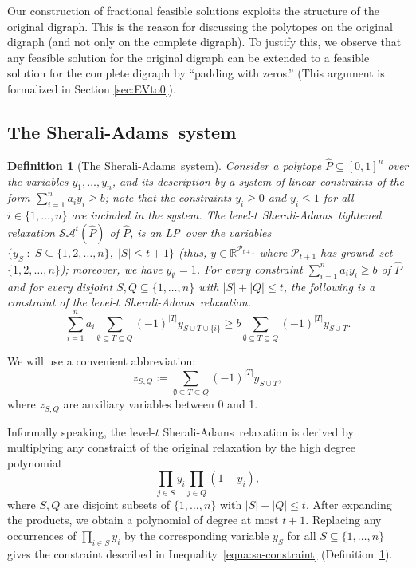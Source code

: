 \documentclass[11pt]{article}
\newtheorem{definition}[theorem]{Definition}
\newcommand{\sa}{\textsf{Sherali-Adams}}
\newcommand{\pop}{\mathcal{P}}
\newcommand \reals {\mathbb{R}}
\newcommand{\iLP}{\textsf{LP}}
\newcommand{\saop}{\mathcal{SA}}
\begin{document}
Our construction of fractional feasible solutions exploits the
structure of the original digraph.
This is the reason for discussing the polytopes on the original digraph
(and not only on the complete digraph).
To justify this, we observe that any feasible solution for the original
digraph can be extended to a feasible solution for the complete digraph
by ``padding with zeros.'' (This argument is formalized in Section
\ref{sec:EVto0}).





\subsection{The \sa\ system}

\begin{definition}[The \sa\ system]\label{def:SA-definition}
Consider a polytope $\widehat{P} \subseteq [0,1]^n$ over the variables
$y_1,\ldots, y_n$, and its description by a system of linear
constraints of the form $\sum_{i=1}^n a_i y_i \geq{b}$;
note that the constraints $y_i\ge0$ and $y_i\le{1}$
for all $i\in\{1,\dots,n\}$
are included in the system.
The level-$t$ \sa\ tightened relaxation $\saop^t(\widehat{P})$
of $\widehat{P}$, is an \iLP\ over the variables
 $\{y_S\;:\; S\subseteq \{1,2,\ldots,n\},\; |S|\le{t+1} \}$
(thus, $y\in\reals^{\pop_{t+1}}$ where
$\pop_{t+1}$ has ground~set $\{1,2,\ldots,n\}$);
moreover, we have $y_{\emptyset} =1$.
For every constraint $\sum_{i=1}^n a_i y_i\geq{b}$
of $\widehat{P}$ and for every disjoint $S,Q \subseteq \{1,\ldots, n\}$
with $|S|+|Q|\leq t$, the following is a constraint of the
level-$t$ \sa\ relaxation.
\begin{equation}\label{equa:sa-constraint}
\sum_{i=1}^n a_i \sum_{\emptyset \subseteq T \subseteq Q}
	(-1)^{|T|} y_{S \cup T \cup \{i\} }
  \geq b \sum_{\emptyset \subseteq T \subseteq Q}
	(-1)^{|T|} y_{S \cup T }.
\end{equation}
\end{definition}


We will use a convenient abbreviation:
  \[
  z_{S,Q} := \sum_{\emptyset \subseteq T \subseteq Q} (-1)^{|T|} y_{S \cup T },
  \]
where $z_{S,Q}$ are auxiliary variables between 0 and 1. 

Informally speaking, the level-$t$ \sa\ relaxation is derived by
multiplying any constraint of the original relaxation by the high
degree polynomial 
$$\prod_{j \in S} y_i \prod_{j \in Q} (1-y_i),$$
where
$S,Q$ are disjoint subsets of $\{1,\ldots, n\}$ with $|S|+|Q|\leq t$.
After expanding the products, we obtain a polynomial of degree at most
$t+1$. Replacing any occurrences of $\prod_{i \in S} y_i$ by the
corresponding variable $y_S$ for all $S\subseteq\{1,\ldots, n\}$ gives
the constraint described in Inequality~\eqref{equa:sa-constraint}
(Definition~\ref{def:SA-definition}).
\end{document}
